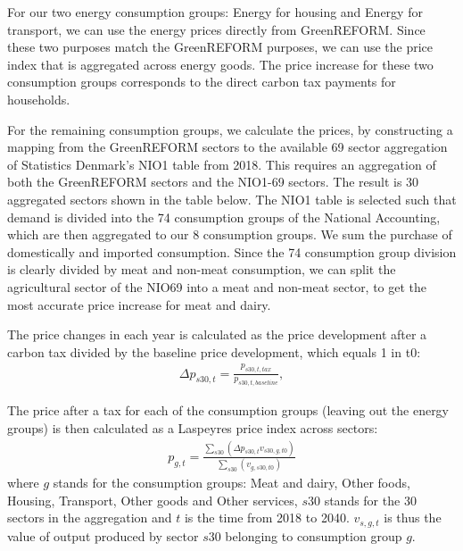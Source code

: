For our two energy consumption groups: Energy for housing and Energy for transport, we can use the energy prices directly from GreenREFORM. Since these two purposes match the GreenREFORM purposes, we can use the price index that is aggregated across energy goods. The price increase for these two consumption groups corresponds to the direct  carbon tax payments for households.

For the remaining consumption groups, we calculate the prices, by constructing a mapping from the GreenREFORM sectors to the available 69 sector aggregation of Statistics Denmark's NIO1 table from 2018. This requires an aggregation of both the GreenREFORM sectors and the NIO1-69 sectors. The result is 30 aggregated sectors shown in the table below. The NIO1 table is selected such that demand is divided into the 74 consumption groups of the National Accounting, which are then aggregated to our 8 consumption groups. We sum the purchase of domestically and imported consumption. Since the 74 consumption group division is clearly divided by meat and non-meat consumption, we can split the agricultural sector of the NIO69 into a meat and non-meat sector, to get the most accurate price increase for meat and dairy. 

 The price changes in each year is calculated as the price development after a carbon tax divided by the baseline price development, which equals 1 in t0: 
\begin{align}
    \Delta p_{s30,t} = \frac{p_{s30,t,tax}}{p_{s30,t,baseline}},
\end{align}

The price after a tax for each of the consumption groups (leaving out the energy groups) is then calculated as a Laspeyres price index across sectors:
\begin{align}
    p_{g,t} = \frac{\sum_{s30}(\Delta p_{s30,t}v_{s30,g,t0})}{\sum_{s30} (v_{g,s30,t0})}
\end{align}
where $g$ stands for the consumption groups: Meat and dairy, Other foods, Housing, Transport, Other goods and Other services, $s30$ stands for the 30 sectors in the aggregation and $t$ is the time from 2018 to 2040. $v_{s,g,t}$ is thus the value of output produced by sector $s30$ belonging to consumption group $g$. 


